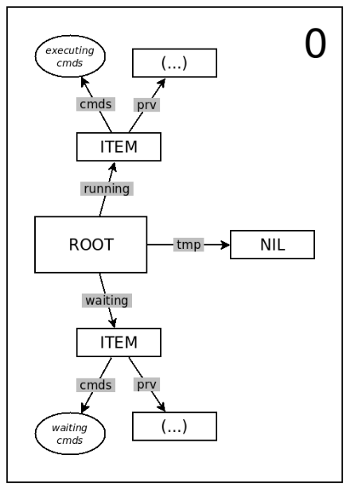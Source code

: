 \documentclass{sig-alternate}
\begin{document}
\begin{figure}%
\begin{minipage}[t]{0.24\linewidth}
\centering
\includegraphics[scale=0.25]{queue-10.png}
\end{minipage}
\begin{minipage}[t]{0.24\linewidth}
\centering

\end{minipage}
\end{figure}
\end{document}
